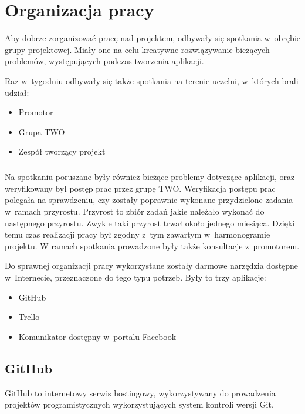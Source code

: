 \chapter{Organizacja pracy}



Aby dobrze zorganizować pracę nad projektem, odbywały się spotkania w~obrębie grupy projektowej. Miały one na celu kreatywne rozwiązywanie bieżących problemów, występujących podczas tworzenia aplikacji. 

Raz w~tygodniu odbywały się także spotkania na terenie uczelni, w~których brali udział:
\begin{itemize}
\item Promotor
\item Grupa TWO
\item Zespół tworzący projekt
\end{itemize}

\paragraph{}
Na spotkaniu poruszane były również bieżące problemy dotyczące aplikacji, oraz weryfikowany był postęp prac przez grupę TWO. Weryfikacja postępu prac polegała na sprawdzeniu, czy zostały poprawnie wykonane przydzielone zadania w~ramach przyrostu. Przyrost to zbiór zadań jakie należało wykonać do następnego przyrostu. Zwykle taki przyrost trwał około jednego miesiąca. Dzięki temu czas realizacji pracy był zgodny z~tym zawartym w~harmonogramie projektu. W ramach spotkania prowadzone były także konsultacje z~promotorem.

Do sprawnej organizacji pracy wykorzystane zostały darmowe narzędzia dostępne w~Internecie, przeznaczone do tego typu potrzeb. Były to trzy aplikacje:
\begin{itemize}
\item GitHub
\item Trello
\item Komunikator dostępny w~portalu Facebook
\end{itemize}

\section{GitHub}
GitHub to internetowy serwis hostingowy, wykorzystywany do prowadzenia projektów programistycznych wykorzystujących system kontroli wersji Git. 


